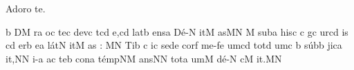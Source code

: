 \beginhymn Adoro te.

\Internote
{}
\initiumgregorianum
\znotes\fissum{1pt}\bmolle b\en
{}%
\sgn {}{}D\punctum M\egn
{}r\punctum a\egn
\sgn {}o{}\punctum c\egn
\spatium
\begingroup
\bgenerale
\sgn te{}\punctum c\egn
\spatium
\sgn dev\punctum c\egn
{}t\pes cd\egn
\sgn {}e,\punctum c\augmentum d\egn
\spatium
\divisiominima
\spatium
\sgn l{a}t\punctum b\egn
\sgn {}e{ns}\punctum a\egn
\spatium
\sgn D{\'e}-\punctum N\egn
\sgn {}it\punctum M\egn
\sgn {}as\punctum M\augmentum N\egn
\spatium
\divisiominor
\spatium
{}\punctum M\egn
\spatium
\sgn sub\punctum a\egn
\spatium
\sgn his\punctum c\egn
\spatium
\custos c
\lineaproxima
g\punctum c\egn
\sgn {}ur\pes cd\egn
\sgn {}i{s }\punctum c\augmentum d\egn
\spatium
\divisiominima
\spatium
{}er\punctum b\egn
\sgn {}e{}\punctum a\egn
\spatium
\sgn l{\'a}t\punctum N\egn
\sgn {}it\punctum M\egn
\sgn {}a{s : }\punctum M\augmentum N\egn
\spatium
\divisiomaior
\spatium
\sgn T{i}b%
\punctum c\egn
\sgn {}i{}\punctum c\egn
\spatium
\sgn se{}\pes de\egn
\spatium
\sgn cor\punctum f\egn
\spatium
\sgn m{e}-\clivis fe\egn
\sgn {}um\punctum c\augmentum d\egn
\spatium
\divisiominima
\spatium
\sgn t{o}t\punctum d\egn
\sgn {}um\punctum c\egn
\spatium
\custos b
\lineaproxima
\sgn s{\'u}b\punctum b\egn
\sgn jic\punctum a\egn
\sgn {}i{t,}\engl{}\punctum N\augmentum N\egn
\spatium
\divisiominor
\spatium
{}i-\punctum a\egn
\sgn {}a{}\punctum c\egn
\spatium
\sgn te{}\punctum b\egn
\spatium
\sgn con\punctum a\egn
\sgn t{\'e}{mp}\clivis NM\egn
{}a{ns}\punctum N\augmentum N\egn
\spatium
\divisiominima
\spatium
\sgn t{o}t\punctum a\egn
\sgn {}um\punctum M\egn
\spatium
\sgn d{\'e}-\punctum N\egn
{}c\punctum M\egn
\sgn {}i{t.}\punctum M\augmentum N\egn
\spatium
\endgroup
\Finisgregoriana

\bigskip

\beginlyrics

